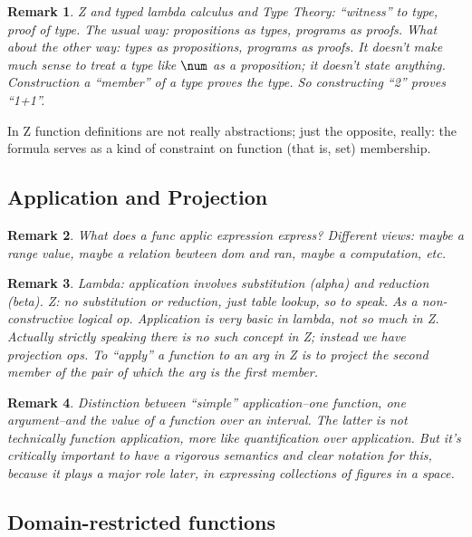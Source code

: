 \documentclass[12pt]{tufte-handout}
\numberwithin{equation}{subsection}
\numberwithin{equation}{subsection}
\newtheorem{remark}{Remark}
\begin{document}
  \begin{remark}
    Z and typed lambda calculus and Type Theory: ``witness'' to type,
    proof of type.  The usual way: propositions as types, programs as
    proofs.  What about the other way: types as propositions, programs
    as proofs.  It doesn't make much sense to treat a type like
    \(\num\) as a proposition; it doesn't state anything.
    Construction a ``member'' of a type proves the type.  So
    constructing ``2'' proves ``1+1''.
  \end{remark}

  In Z function definitions are not really abstractions; just the
  opposite, really: the formula serves as a kind of constraint on
  function (that is, set) membership.

  \subsection{Application and Projection}
  \label{subs:}

  \begin{remark}
    What does a func applic expression express?  Different views:
    maybe a range value, maybe a relation bewteen dom and ran, maybe a
    computation, etc.
  \end{remark}

  \begin{remark}
    Lambda: application involves substitution (alpha) and reduction
    (beta).  Z: no substitution or reduction, just table lookup, so to
    speak.  As a non-constructive logical op.  Application is very
    basic in lambda, not so much in Z.  Actually strictly speaking
    there is no such concept in Z; instead we have projection ops.  To
    ``apply'' a function to an arg in Z is to project the second
    member of the pair of which the arg is the first member.
  \end{remark}

  \begin{remark}
    Distinction between ``simple'' application--one function, one
    argument--and the value of a function over an interval.  The
    latter is not technically function application, more like
    quantification over application.  But it's critically important to
    have a rigorous semantics and clear notation for this, because it
    plays a major role later, in expressing collections of figures in
    a space.
  \end{remark}

  \subsection{Domain-restricted functions}
  \label{subs:domrestrfunc}
\end{document}
